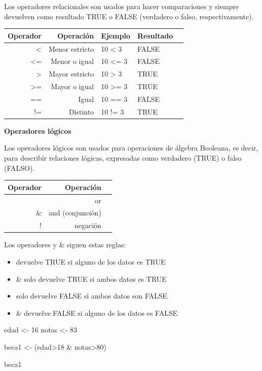 \documentclass[
  12pt,
]{book}
\newenvironment{Shaded}{\begin{snugshade}}{\end{snugshade}}
\newcommand{\DecValTok}[1]{\textcolor[rgb]{0.00,0.00,0.81}{#1}}
\newcommand{\NormalTok}[1]{#1}
\newcommand{\OtherTok}[1]{\textcolor[rgb]{0.56,0.35,0.01}{#1}}
\newcommand{\SpecialCharTok}[1]{\textcolor[rgb]{0.00,0.00,0.00}{#1}}
\providecommand{\tightlist}{%
  \setlength{\itemsep}{0pt}\setlength{\parskip}{0pt}}
\begin{document}
Los operadores relacionales son usados para hacer comparaciones y siempre devuelven como resultado TRUE o FALSE (verdadero o falso, respectivamente).

\begin{longtable}[]{@{}rrlll@{}}
\toprule
Operador & Operación & Ejemplo & Resultado &\tabularnewline
\midrule
\endhead
\textless{} & Menor estricto & 10 \textless{} 3 & FALSE &\tabularnewline
\textless= & Menor o igual & 10 \textless= 3 & FALSE &\tabularnewline
\textgreater{} & Mayor estricto & 10 \textgreater{} 3 & TRUE &\tabularnewline
\textgreater= & Mayor o igual & 10 \textgreater= 3 & TRUE &\tabularnewline
== & Igual & 10 == 3 & FALSE &\tabularnewline
!= & Distinto & 10 != 3 & TRUE &\tabularnewline
\bottomrule
\end{longtable}

\textbf{Operadores lógicos}

Los operadores lógicos son usados para operaciones de álgebra Booleana, es decir, para describir relaciones lógicas, expresadas como verdadero (TRUE) o falso (FALSO).

\begin{longtable}[]{@{}rrl@{}}
\toprule
Operador & Operación &\tabularnewline
\midrule
\endhead
\textbar{} & or &\tabularnewline
\& & and (conjunción) &\tabularnewline
! & negación &\tabularnewline
\bottomrule
\end{longtable}

Los operadores \textbar{} y \& siguen estas reglas:

\begin{itemize}
\tightlist
\item
  \textbar{} devuelve TRUE si alguno de los datos es TRUE
\item
  \& solo devuelve TRUE si ambos datos es TRUE
\item
  \textbar{} solo devuelve FALSE si ambos datos son FALSE
\item
  \& devuelve FALSE si alguno de los datos es FALSE
\end{itemize}

\begin{Shaded}
\begin{Highlighting}[]
\NormalTok{edad }\OtherTok{\textless{}{-}} \DecValTok{16}
\NormalTok{notas }\OtherTok{\textless{}{-}} \DecValTok{83}

\NormalTok{beca1 }\OtherTok{\textless{}{-}}\NormalTok{ (edad}\SpecialCharTok{\textgreater{}}\DecValTok{18} \SpecialCharTok{\&}\NormalTok{ notas}\SpecialCharTok{\textgreater{}}\DecValTok{80}\NormalTok{)}

\NormalTok{beca1}
\end{Highlighting}
\end{Shaded}
\end{document}
